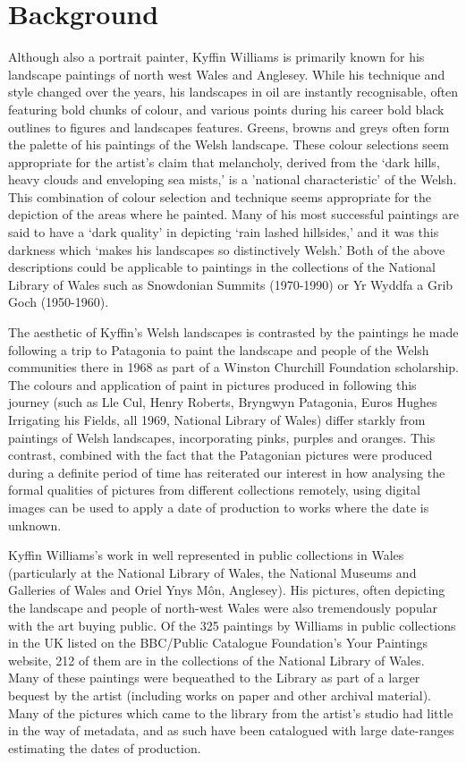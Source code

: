 \documentclass[conference,a4paper]{IEEEtran}
\begin{document}
\section{Background}
Although also a portrait painter, Kyffin Williams is primarily known for his landscape paintings 
of north west Wales and Anglesey. While his technique and style changed over the years, his 
landscapes in oil are instantly recognisable, often featuring bold chunks of colour, and various 
points during his career bold black outlines to figures and landscapes features. Greens, browns 
and greys often form the palette of his paintings of the Welsh landscape. These colour selections 
seem appropriate for the artist’s claim that melancholy, derived from the `dark hills, heavy 
clouds and enveloping sea mists,' is a 'national characteristic’ of the Welsh.\cite{Williams1993Across} 
This combination of colour selection and technique seems appropriate for the depiction of the 
areas where he painted. Many of his most successful paintings are said to have a `dark quality' in
depicting `rain lashed hillsides,' and it was this darkness which `makes his landscapes so 
distinctively Welsh.'\cite{Davies2004100} Both of the above descriptions could be applicable to paintings 
in the collections of the National Library of Wales such as Snowdonian Summits (1970-1990) or 
Yr Wyddfa a Grib Goch (1950-1960).

The aesthetic of Kyffin’s Welsh landscapes is contrasted by the paintings he made following a 
trip to Patagonia to paint the landscape and people of the Welsh communities there in 1968 as part
of a Winston Churchill Foundation scholarship. The colours and application of paint in pictures 
produced in following this journey (such as Lle Cul, Henry Roberts, Bryngwyn Patagonia, Euros 
Hughes Irrigating his Fields, all 1969, National Library of Wales) differ starkly from paintings 
of Welsh landscapes, incorporating pinks, purples and oranges. This contrast, combined with the 
fact that the Patagonian pictures were produced during a definite period of time has reiterated 
our interest in how analysing the formal qualities of pictures from different collections 
remotely, using digital images can be used to apply a date of production to works where the date 
is unknown.

Kyffin Williams’s work in well represented in public collections in Wales (particularly at the 
National Library of Wales, the National Museums and Galleries of Wales and Oriel Ynys Môn, 
Anglesey). His pictures, often depicting the landscape and people of north-west Wales were also 
tremendously popular with the art buying public. Of the 325 paintings by Williams in public 
collections in the UK listed on the BBC/Public Catalogue Foundation’s Your Paintings website, 212 
of them are in the collections of the National Library of Wales\cite{2013Your}. Many of 
these paintings were bequeathed to the Library as part of a larger bequest by the artist 
(including works on paper and other archival material). Many of the pictures which came to the 
library from the artist’s studio had little in the way of metadata, and as such have been 
catalogued with large date-ranges estimating the dates of production.  
\end{document}
